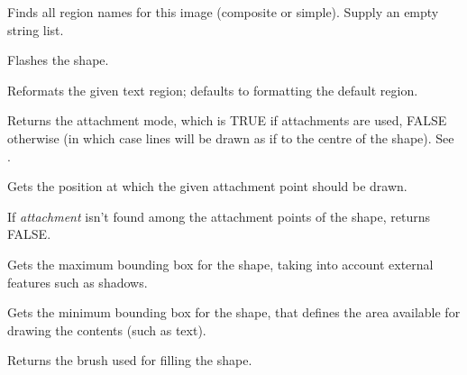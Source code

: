 Finds all region names for this image (composite or simple).
Supply an empty string list.



Flashes the shape.



Reformats the given text region; defaults to formatting the default region.



Returns the attachment mode, which is TRUE if attachments are used, FALSE otherwise (in which case
lines will be drawn as if to the centre of the shape). See .

\label{wxshapegetattachmentposition}


Gets the position at which the given attachment point should be drawn.

If {\it attachment} isn't found among the attachment points of the shape, returns FALSE.



Gets the maximum bounding box for the shape, taking into
account external features such as shadows.



Gets the minimum bounding box for the shape, that defines
the area available for drawing the contents (such as text).



Returns the brush used for filling the shape.

